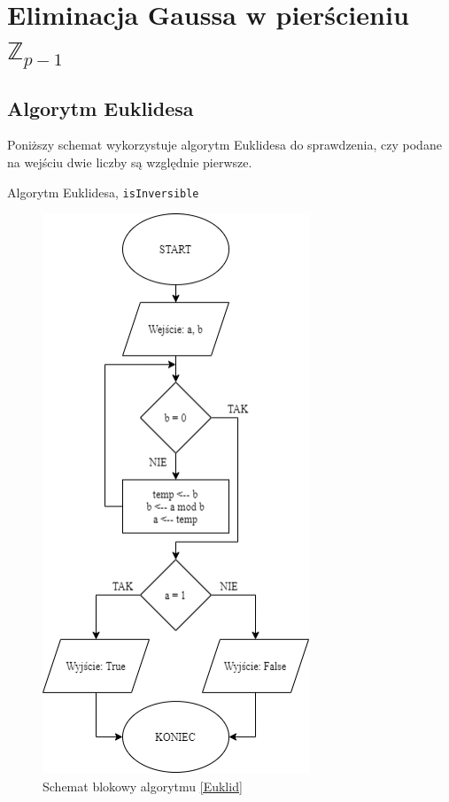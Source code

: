 \documentclass[]{article}
\begin{document}
\newpage
\section{Eliminacja Gaussa w pierścieniu \(\mathbb{Z}_{p-1}\)}
	\subsection{Algorytm Euklidesa}
		Poniższy schemat wykorzystuje algorytm Euklidesa do sprawdzenia, czy podane na wejściu dwie liczby są względnie pierwsze. \\
	\begin{algorithm}[H]
		\label{Euklid}
		\caption{Algorytm Euklidesa, \texttt{isInversible}}
		\BlankLine
		
	\end{algorithm}

	\begin{figure}[H]
		\begin{center}
			\includegraphics[width=8cm]{alg 7.png} \caption{Schemat blokowy algorytmu \ref{Euklid}}
		\end{center}
	\end{figure}
\end{document}

